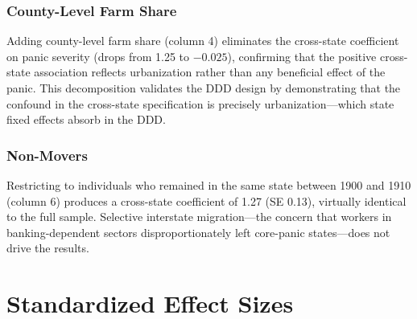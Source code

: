 \documentclass[12pt]{article}
\begin{document}
\subsubsection*{County-Level Farm Share} Adding county-level farm share (column 4) eliminates the cross-state coefficient on panic severity (drops from 1.25 to $-0.025$), confirming that the positive cross-state association reflects urbanization rather than any beneficial effect of the panic. This decomposition validates the DDD design by demonstrating that the confound in the cross-state specification is precisely urbanization---which state fixed effects absorb in the DDD.

\subsubsection*{Non-Movers} Restricting to individuals who remained in the same state between 1900 and 1910 (column 6) produces a cross-state coefficient of 1.27 (SE 0.13), virtually identical to the full sample. Selective interstate migration---the concern that workers in banking-dependent sectors disproportionately left core-panic states---does not drive the results.

\section{Standardized Effect Sizes}
\label{sec:sde}


\end{document}
